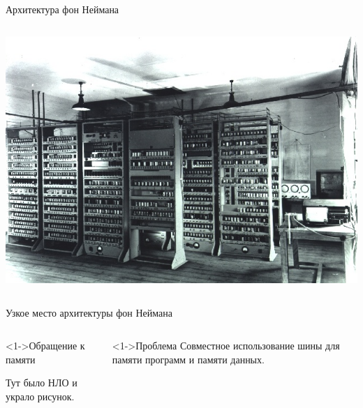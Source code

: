 \documentclass[pdf,9pt,aspectratio=169]{beamer}
\begin{document}
\begin{frame}{Архитектура фон Неймана}
\begin{columns}[c]
\begin{column}[]{0.45\textwidth}
\begin{exampleblock}
\begin{center}
          \includegraphics[height=.33\textheight]{images/EDSAC.jpg}
        \end{center}
      \end{exampleblock}
    \end{column}
  \end{columns}
\end{frame}

\begin{frame}{Узкое место архитектуры фон Неймана}
  \begin{columns}[c]
    \begin{column}[]{0.45\textwidth}  
      \begin{exampleblock}<1->{Обращение к памяти}
        \begin{center}
          Тут было НЛО и украло рисунок.
        \end{center}
      \end{exampleblock}
    \end{column}
    \begin{column}[]{0.45\textwidth}  
      \begin{alertblock}<1->{Проблема}
        Совместное использование шины для памяти программ и памяти данных.
      \end{alertblock}
    \end{column}
  \end{columns}
\end{frame}
\end{document}
